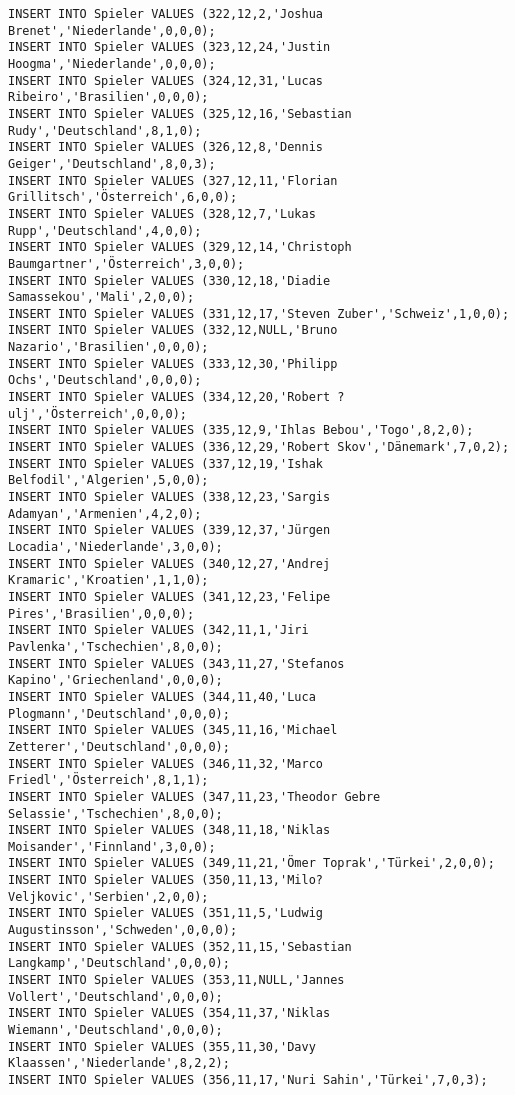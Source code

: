 \documentclass{lehramt-informatik-aufgabe}
\begin{document}
\begin{verbatim}
INSERT INTO Spieler VALUES (322,12,2,'Joshua Brenet','Niederlande',0,0,0);
INSERT INTO Spieler VALUES (323,12,24,'Justin Hoogma','Niederlande',0,0,0);
INSERT INTO Spieler VALUES (324,12,31,'Lucas Ribeiro','Brasilien',0,0,0);
INSERT INTO Spieler VALUES (325,12,16,'Sebastian Rudy','Deutschland',8,1,0);
INSERT INTO Spieler VALUES (326,12,8,'Dennis Geiger','Deutschland',8,0,3);
INSERT INTO Spieler VALUES (327,12,11,'Florian Grillitsch','Österreich',6,0,0);
INSERT INTO Spieler VALUES (328,12,7,'Lukas Rupp','Deutschland',4,0,0);
INSERT INTO Spieler VALUES (329,12,14,'Christoph Baumgartner','Österreich',3,0,0);
INSERT INTO Spieler VALUES (330,12,18,'Diadie Samassekou','Mali',2,0,0);
INSERT INTO Spieler VALUES (331,12,17,'Steven Zuber','Schweiz',1,0,0);
INSERT INTO Spieler VALUES (332,12,NULL,'Bruno Nazario','Brasilien',0,0,0);
INSERT INTO Spieler VALUES (333,12,30,'Philipp Ochs','Deutschland',0,0,0);
INSERT INTO Spieler VALUES (334,12,20,'Robert ?ulj','Österreich',0,0,0);
INSERT INTO Spieler VALUES (335,12,9,'Ihlas Bebou','Togo',8,2,0);
INSERT INTO Spieler VALUES (336,12,29,'Robert Skov','Dänemark',7,0,2);
INSERT INTO Spieler VALUES (337,12,19,'Ishak Belfodil','Algerien',5,0,0);
INSERT INTO Spieler VALUES (338,12,23,'Sargis Adamyan','Armenien',4,2,0);
INSERT INTO Spieler VALUES (339,12,37,'Jürgen Locadia','Niederlande',3,0,0);
INSERT INTO Spieler VALUES (340,12,27,'Andrej Kramaric','Kroatien',1,1,0);
INSERT INTO Spieler VALUES (341,12,23,'Felipe Pires','Brasilien',0,0,0);
INSERT INTO Spieler VALUES (342,11,1,'Jiri Pavlenka','Tschechien',8,0,0);
INSERT INTO Spieler VALUES (343,11,27,'Stefanos Kapino','Griechenland',0,0,0);
INSERT INTO Spieler VALUES (344,11,40,'Luca Plogmann','Deutschland',0,0,0);
INSERT INTO Spieler VALUES (345,11,16,'Michael Zetterer','Deutschland',0,0,0);
INSERT INTO Spieler VALUES (346,11,32,'Marco Friedl','Österreich',8,1,1);
INSERT INTO Spieler VALUES (347,11,23,'Theodor Gebre Selassie','Tschechien',8,0,0);
INSERT INTO Spieler VALUES (348,11,18,'Niklas Moisander','Finnland',3,0,0);
INSERT INTO Spieler VALUES (349,11,21,'Ömer Toprak','Türkei',2,0,0);
INSERT INTO Spieler VALUES (350,11,13,'Milo? Veljkovic','Serbien',2,0,0);
INSERT INTO Spieler VALUES (351,11,5,'Ludwig Augustinsson','Schweden',0,0,0);
INSERT INTO Spieler VALUES (352,11,15,'Sebastian Langkamp','Deutschland',0,0,0);
INSERT INTO Spieler VALUES (353,11,NULL,'Jannes Vollert','Deutschland',0,0,0);
INSERT INTO Spieler VALUES (354,11,37,'Niklas Wiemann','Deutschland',0,0,0);
INSERT INTO Spieler VALUES (355,11,30,'Davy Klaassen','Niederlande',8,2,2);
INSERT INTO Spieler VALUES (356,11,17,'Nuri Sahin','Türkei',7,0,3);

\end{verbatim}
\end{document}
